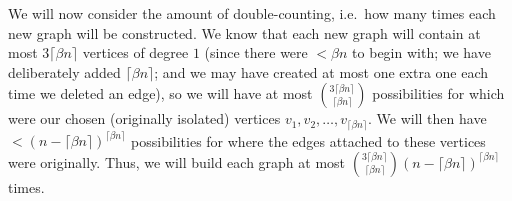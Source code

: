 \documentclass{article}
\newtheorem{Proof of Theorem}{Proof of Theorem}
\begin{document}
We will now consider the amount of double-counting,
i.e.~how many times each new graph will be constructed.
We know that each new graph will contain at most $3 \lceil \beta n \rceil$ vertices of degree $1$
(since there were $< \beta n$ to begin with;
we have deliberately added $\lceil \beta n \rceil$;
and we may have created at most one extra one each time we deleted an edge),
so we will have at most $\left(^{3 \lceil \beta n \rceil} _{\phantom{l} \lceil \beta n \rceil} \right)$
possibilities for which were our chosen (originally isolated) vertices
$v_{1},v_{2}, \ldots, v_{\lceil \beta n \rceil}$.
We will then have $<(n- \lceil \beta n \rceil)^{\lceil \beta n \rceil}$ possibilities for where the edges 
attached to these vertices were originally.
Thus, we will build each graph at most $\left(^{3 \lceil \beta n \rceil} _{\phantom{l} \lceil \beta n \rceil} \right) 
(n-\lceil \beta n \rceil)^{\lceil \beta n \rceil}$ times.
\end{document}
